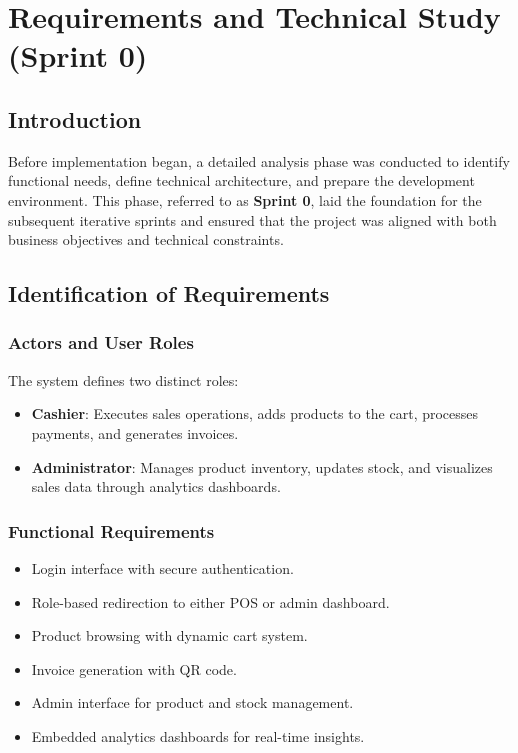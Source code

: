 \chapter{Requirements and Technical Study (Sprint 0)}

\section{Introduction}

Before implementation began, a detailed analysis phase was conducted to identify functional needs, define technical architecture, and prepare the development environment. This phase, referred to as \textbf{Sprint 0}, laid the foundation for the subsequent iterative sprints and ensured that the project was aligned with both business objectives and technical constraints.

\section{Identification of Requirements}

\subsection{Actors and User Roles}

The system defines two distinct roles:

\begin{itemize}
  \item \textbf{Cashier}: Executes sales operations, adds products to the cart, processes payments, and generates invoices.
  \item \textbf{Administrator}: Manages product inventory, updates stock, and visualizes sales data through analytics dashboards.
\end{itemize}

\subsection{Functional Requirements}

\begin{itemize}
  \item Login interface with secure authentication.
  \item Role-based redirection to either POS or admin dashboard.
  \item Product browsing with dynamic cart system.
  \item Invoice generation with QR code.
  \item Admin interface for product and stock management.
  \item Embedded analytics dashboards for real-time insights.
\end{itemize}

